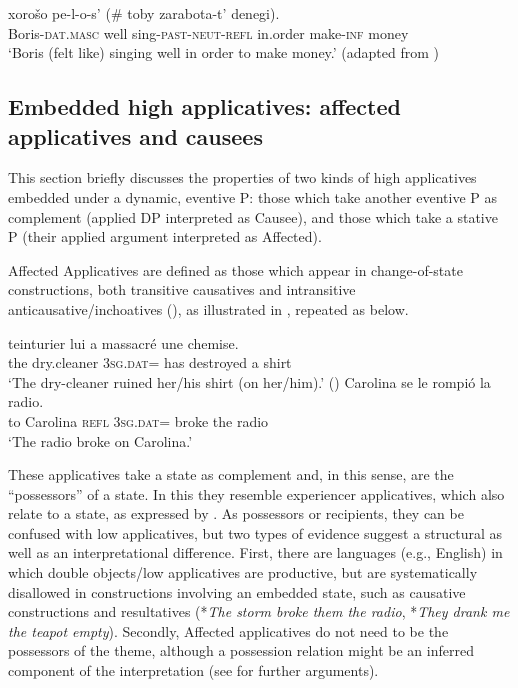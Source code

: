 \documentclass[output=paper,colorlinks,citecolor=brown,nonflat]{./langscibook}
\begin{document}
\ea%
    \label{ex:cuervo:11}
     {xorošo} {pe-l-o-s’} {(\# {toby}} {zarabota-t’} {denegi).}\\
    Boris-\textsc{dat.masc}   well sing-\textsc{past-neut-refl} in.order make-\textsc{inf} money\\
    \glt ‘Boris (felt like) singing well in order to make money.’   (adapted from \citealt[189]{Skorniakova2009})
    \z

\subsection{Embedded high applicatives: affected applicatives and causees}\label{sec:cuervo:4.3}

This section briefly discusses the properties of two kinds of high applicatives embedded under a dynamic, eventive \liv P: those which take another eventive \liv P as complement (applied DP interpreted as Causee), and those which take a stative \liv P (their applied argument interpreted as Affected).

Affected Applicatives are defined as those which appear in change-of-state constructions, both transitive causatives and intransitive anticausative/inchoatives (\citealt{Cuervo2003,Cuervo2010Probus,Cuervo2015Syntax}), as illustrated in , repeated as  below.

\ea%
    \label{ex:cuervo:12}
    \ea%
        \label{ex:cuervo:12a}
         {teinturier} {lui} {a} {massacré} {une} {chemise.}\\
        the dry.cleaner 3\textsc{sg.dat}= has destroyed a shirt\\
        \glt ‘The dry-cleaner ruined her/his shirt (on her/him).’  (\citealt{BonehNash2012})
    \ex%
        \label{ex:cuervo:12b}
         {Carolina} {se} {le} {rompió} {la} {radio}.\\
        to Carolina  \textsc{refl} 3\textsc{sg.dat}=   broke the radio\\
        \glt ‘The radio broke on Carolina.’
    \z
\z

These applicatives take a state as complement and, in this sense, are the “possessors” of a state. In this they resemble experiencer applicatives, which also relate to a state, as expressed by .  As possessors or recipients, they can be confused with low applicatives, but two types of evidence suggest a structural as well as an interpretational difference. First, there are languages (e.g., English) in which double objects/low applicatives are productive, but are systematically disallowed in constructions involving an embedded state, such as causative constructions and resultatives (*\textit{The storm broke them the radio}, *\textit{They drank me the teapot empty}). Secondly, Affected applicatives do not need to be the possessors of the theme, although a possession relation might be an inferred component of the interpretation (see \citealt{Cuervo2003} for further arguments).
\end{document}
